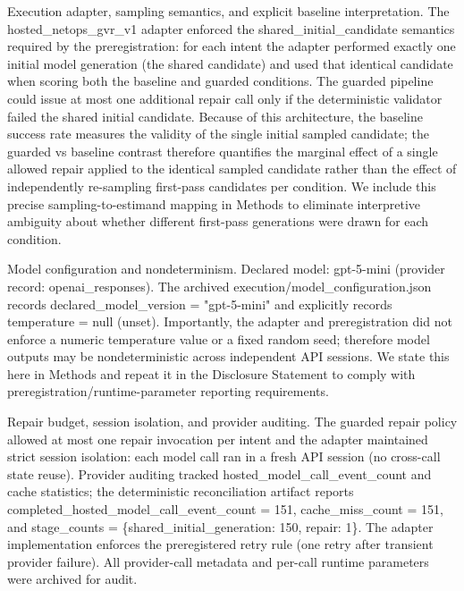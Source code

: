 \documentclass[conference]{IEEEtran}
\begin{document}
Execution adapter, sampling semantics, and explicit baseline interpretation. The hosted\_netops\_gvr\_v1 adapter enforced the shared\_initial\_candidate semantics required by the preregistration: for each intent the adapter performed exactly one initial model generation (the shared candidate) and used that identical candidate when scoring both the baseline and guarded conditions. The guarded pipeline could issue at most one additional repair call only if the deterministic validator failed the shared initial candidate. Because of this architecture, the baseline success rate measures the validity of the single initial sampled candidate; the guarded vs baseline contrast therefore quantifies the marginal effect of a single allowed repair applied to the identical sampled candidate rather than the effect of independently re-sampling first-pass candidates per condition. We include this precise sampling-to-estimand mapping in Methods to eliminate interpretive ambiguity about whether different first-pass generations were drawn for each condition.

Model configuration and nondeterminism. Declared model: gpt-5-mini (provider record: openai\_responses). The archived execution/model\_configuration.json records declared\_model\_version = "gpt-5-mini" and explicitly records temperature = null (unset). Importantly, the adapter and preregistration did not enforce a numeric temperature value or a fixed random seed; therefore model outputs may be nondeterministic across independent API sessions. We state this here in Methods and repeat it in the Disclosure Statement to comply with preregistration/runtime-parameter reporting requirements.

Repair budget, session isolation, and provider auditing. The guarded repair policy allowed at most one repair invocation per intent and the adapter maintained strict session isolation: each model call ran in a fresh API session (no cross-call state reuse). Provider auditing tracked hosted\_model\_call\_event\_count and cache statistics; the deterministic reconciliation artifact reports completed\_hosted\_model\_call\_event\_count = 151, cache\_miss\_count = 151, and stage\_counts = \{shared\_initial\_generation: 150, repair: 1\}. The adapter implementation enforces the preregistered retry rule (one retry after transient provider failure). All provider-call metadata and per-call runtime parameters were archived for audit.
\end{document}
